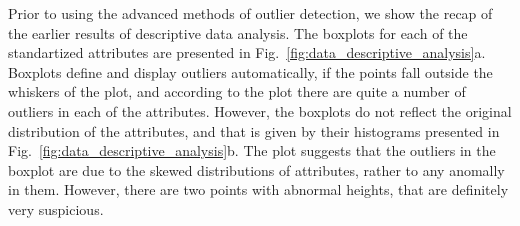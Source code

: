 \documentclass[10pt, paper=a4]{article}
\begin{document}
Prior to using the advanced methods of outlier detection, we show the recap of
the earlier results of descriptive data analysis.  The boxplots for each of the
standartized attributes are presented in
Fig.~\ref{fig:data_descriptive_analysis}a.  Boxplots define and display outliers
automatically, if the points fall outside the whiskers of the plot, and
according to the plot there are quite a number of outliers in each of the
attributes.  However, the boxplots do not reflect the original distribution of
the attributes, and that is given by their histograms presented in
Fig.~\ref{fig:data_descriptive_analysis}b.  The plot suggests that the outliers
in the boxplot are due to the skewed distributions of attributes, rather to any
anomally in them.  However, there are two points with abnormal heights, that are
definitely very suspicious.
\end{document}
